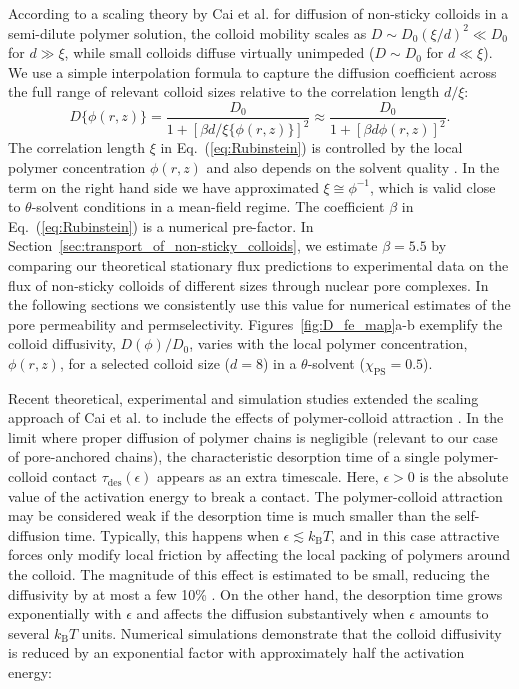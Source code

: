 \documentclass[12pt, a4paper]{article}
\begin{document}
According to a scaling theory by Cai et al. \cite{Cai2011} for diffusion of non-sticky colloids in a semi-dilute polymer solution, the colloid mobility scales as $D\sim D_0 (\xi/d)^2\ll D_0$ for $d\gg \xi$, while small colloids diffuse virtually unimpeded ($D\sim D_0$ for $d\ll \xi$). We use a simple interpolation formula to capture the diffusion coefficient across the full range of relevant colloid sizes relative to the correlation length $d / \xi$:
\begin{equation}
    D\{\phi(r,z)\} = \frac{D_0}{1+[\beta d / \xi\{\phi(r,z)\}]^2} \approx \frac{D_0}{1+[\beta d \phi(r,z)]^2} .
    \label{eq:Rubinstein}
\end{equation}
The correlation length $\xi$ in Eq.~(\ref{eq:Rubinstein}) is controlled by the local polymer concentration $\phi(r,z)$ and also depends on the solvent quality \cite{DeGennes1979}.
In the term on the right hand side we have approximated $\xi \cong \phi^{-1}$, which is valid close to $\theta$-solvent conditions in a mean-field regime.
The coefficient $\beta$ in Eq.~(\ref{eq:Rubinstein}) is a numerical pre-factor.
In Section~\ref{sec:transport_of_non-sticky_colloids}, we estimate $\beta = 5.5$ by comparing our theoretical stationary flux predictions to experimental data on the flux of non-sticky colloids of different sizes through nuclear pore complexes.
In the following sections we consistently use this value for numerical estimates of the pore permeability and permselectivity.
Figures~\ref{fig:D_fe_map}a-b exemplify the colloid diffusivity, $D(\phi)/D_{0}$, varies with the local polymer concentration, $\phi(r,z)$, for a selected  colloid size ($d = 8$) in a $\theta$-solvent ($\chi_{\text{PS}} = 0.5$).

Recent theoretical, experimental and simulation studies extended the scaling approach of Cai et al. \cite{Cai2011} to include the effects of polymer-colloid attraction \cite{Yamamoto2018, Carroll2018}.
In the limit where proper diffusion of polymer chains is negligible (relevant to our case of pore-anchored chains), the characteristic desorption time of a single polymer-colloid contact $\tau_\text{des}(\epsilon)$ appears as an extra timescale.
Here, $\epsilon > 0$ is the absolute value of the activation energy to break a contact.
The polymer-colloid attraction may be considered weak if the desorption time is much smaller than the self-diffusion time.
Typically, this happens when $\epsilon \lesssim k_\text{B} T$, and in this case attractive forces only modify local friction by affecting the local packing of polymers around the colloid.
The magnitude of this effect is estimated to be small, reducing the diffusivity by at most a few 10\% \cite{Yamamoto2011}.
On the other hand, the desorption time grows exponentially with $\epsilon$ and affects the diffusion substantively when $\epsilon$ amounts to several $k_\text{B} T$ units.
Numerical simulations \cite{Yamamoto2018} demonstrate that the colloid diffusivity is reduced by an exponential factor with approximately half the activation energy:
\end{document}
